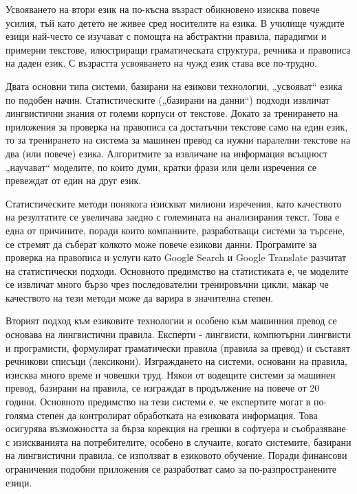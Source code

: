 \documentclass[]{../../metanetpaper}
\begin{document}
\begin{multicols}{2}
Усвояването на втори език на по-късна възраст обикновено изисква
 повече усилия, тъй като детето не живее сред
 носителите на езика. В училище чуждите езици най-често се изучават с помощта на абстрактни правила, парадигми и примерни текстове, илюстриращи  граматическата структура, речника и правописа на даден език. С възрастта  усвояването на чужд език става все по-трудно.

Двата основни типа системи, базирани на езикови технологии, „усвояват“ езика по подобен начин. Статистическите („базирани на данни“) подходи извличат
 лингвистични знания от големи корпуси от текстове. Докато  за тренирането на приложения за проверка на правописа са достатъчни текстове само на един език, то за тренирането на система за машинен превод са нужни паралелни текстове на два (или повече) езика. Алгоритмите за извличане на информация всъщност „научават“ моделите, по които думи, кратки
 фрази или цели изречения се превеждат от един на друг език. 

Статистическите методи понякога изискват милиони изречения, като качеството на резултатите се увеличава заедно с големината на анализирания
 текст. Това е една от причините, поради които компаниите, разработващи системи за търсене, се стремят да съберат колкото
 може повече езикови данни. Програмите за проверка на
 правописа и услуги като Googlе Search и Google Translate разчитат на статистически подходи. Основното предимство на статистиката е, че моделите се извличат много бързо чрез последователни тренировъчни цикли, макар че качеството на тези методи може да варира в значителна степен.

Вторият подход към езиковите технологии и особено към машинния превод се основава на лингвистични правила. Експерти - лингвисти, компютърни лингвисти и програмисти, формулират  граматически правила (правила за превод) и съставят
 речникови списъци (лексикони). Изграждането на системи, основани на правила, изисква много време и човешки труд. 
Някои от водещите системи за машинен превод, базирани на правила, се
 изграждат в продължение на повече от 20 години. Основното предимство
 на тези системи е, че експертите могат в по-голяма степен да контролират обработката на езиковата информация. 
Това осигурява възможността за бърза корекция на грешки в софтуера и
съобразяване с изискванията на потребителите, особено в случаите, когато системите, базирани на лингвистични правила, се използват в езиковото обучение.
Поради финансови ограничения подобни приложения се разработват само за
 по-разпространените езици.


\end{multicols}
\end{document}
